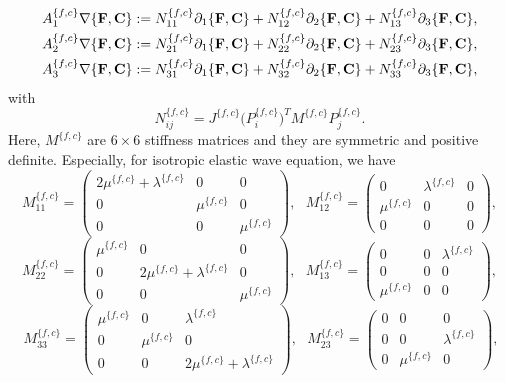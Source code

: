 \begin{align*} 
	A_1^{\{f,c\}}\nabla\{{\bf F}, {\bf C}\} &:= N_{11}^{\{f,c\}}\partial_1\{{\bf F}, {\bf C}\} + N_{12}^{\{f,c\}}\partial_2\{{\bf F}, {\bf C}\} + N_{13}^{\{f,c\}}\partial_3\{{\bf F}, {\bf C}\}, \\
	A_2^{\{f,c\}}\nabla\{{\bf F}, {\bf C}\} &:= N_{21}^{\{f,c\}}\partial_1\{{\bf F}, {\bf C}\} + N_{22}^{\{f,c\}}\partial_2\{{\bf F}, {\bf C}\} + N_{23}^{\{f,c\}}\partial_3\{{\bf F}, {\bf C}\}, \\
	A_3^{\{f,c\}}\nabla\{{\bf F}, {\bf C}\} &:= N_{31}^{\{f,c\}}\partial_1\{{\bf F}, {\bf C}\} + N_{32}^{\{f,c\}}\partial_2\{{\bf F}, {\bf C}\} + N_{33}^{\{f,c\}}\partial_3\{{\bf F}, {\bf C}\},
\end{align*}
with
\begin{equation}\label{N_definition}
	N_{ij}^{\{f,c\}} = J^{\{f,c\}}\big(P^{\{f,c\}}_i\big)^TM^{\{f,c\}}P_j^{\{f,c\}}.
\end{equation}
Here, $M^{\{f,c\}}$ are $6\times 6$ stiffness matrices and they are symmetric and positive definite. Especially, for isotropic elastic wave equation, we have
\[ M_{11}^{\{f,c\}} = \left(\begin{array}{ccc}
2\mu^{\{f,c\}}+\lambda^{\{f,c\}} & 0 & 0\\
0 & \mu^{\{f,c\}} & 0\\
0 & 0 & \mu^{\{f,c\}}\end{array}\right),\ \ \  M_{12}^{\{f,c\}} = \left(\begin{array}{ccc}
0 & \lambda^{\{f,c\}} & 0\\
\mu^{\{f,c\}} & 0 & 0\\
0 & 0 & 0\end{array}\right), \]
\begin{equation}\label{M_definition}
M_{22}^{\{f,c\}} = \left(\begin{array}{ccc}
\mu^{\{f,c\}} & 0 & 0\\
0 & 2\mu^{\{f,c\}}+\lambda^{\{f,c\}} & 0\\
0 & 0 & \mu^{\{f,c\}}\end{array}\right),\ \ \ M_{13}^{\{f,c\}} = \left(\begin{array}{ccc}
0 & 0 & \lambda^{\{f,c\}}\\
0 & 0 & 0\\
\mu^{\{f,c\}} & 0 & 0\end{array}\right),
\end{equation}
\[\ M_{33}^{\{f,c\}} = \left(\begin{array}{ccc}
\mu^{\{f,c\}} & 0 & \lambda^{\{f,c\}}\\
0 & \mu^{\{f,c\}} & 0\\
0 & 0 & 2\mu^{\{f,c\}}+\lambda^{\{f,c\}}\end{array}\right),\ \ \ M_{23}^{\{f,c\}} = \left(\begin{array}{ccc}
0 & 0 & 0\\
0 & 0 & \lambda^{\{f,c\}}\\
0 & \mu^{\{f,c\}} & 0\end{array}\right),\]
